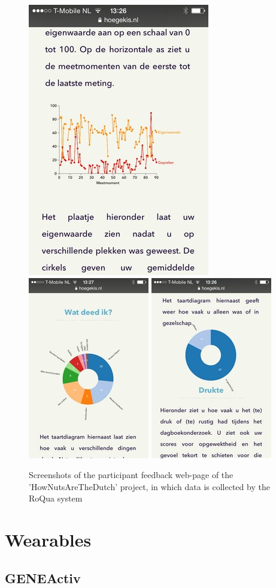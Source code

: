\documentclass[]{book}
\begin{document}
\begin{figure}[!t]

{\centering \includegraphics[width=0.25\linewidth]{images/instruments/roqua/roqua_p1} \includegraphics[width=0.25\linewidth]{images/instruments/roqua/roqua_p2} \includegraphics[width=0.25\linewidth]{images/instruments/roqua/roqua_p3} 

}

\caption{Screenshots of the participant feedback web-page of the 'HowNutsAreTheDutch' project, in which data is collected by the RoQua system}\label{fig:roqua}
\end{figure}

\section{Wearables}\label{wearables}

\subsection{GENEActiv}\label{geneactiv}
\end{document}
